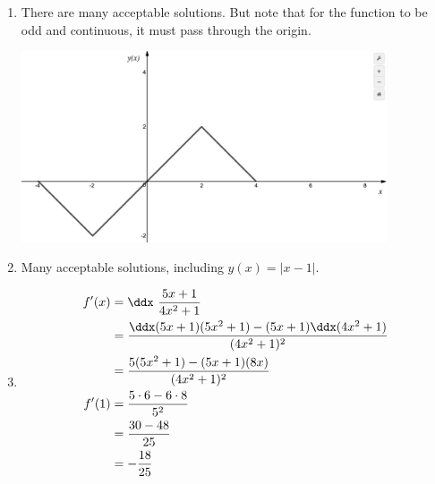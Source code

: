 \begin{enumerate}
    \item There are many acceptable solutions. But note that for the function to be odd and continuous, it must pass through the origin. 
    
    	\begin{center}
		\includegraphics[width=0.85\textwidth]{images/imgWS5OddSpring17.png} 
	\end{center}
    
    \item Many acceptable solutions, including $y(x) = |x-1|$.
    \item \begin{align*}
    f'(x) 
    &= \ddx \ \frac{5x + 1}{4x^2 + 1} \\
    &= \frac{\ddx (5x+1) (5x^2 + 1) - (5x+1)\ddx(4x^2+1)}{(4x^2+1)^2} \\
    &= \frac{5 (5x^2 + 1) - (5x+1)(8x)}{(4x^2+1)^2} \\
    f'(1) &= \frac{5\cdot 6 - 6\cdot 8}{5^2} \\
    &= \frac{30 - 48}{25} \\
    &= -\frac{18}{25}
   \end{align*}
\end{enumerate}




